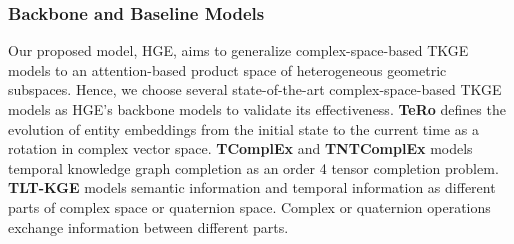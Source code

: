 \documentclass[letterpaper]{article} %
\begin{document}





\subsubsection{Backbone and Baseline Models}
Our proposed model, HGE, aims to generalize complex-space-based TKGE models to an attention-based product space of heterogeneous geometric subspaces. Hence, we choose several state-of-the-art complex-space-based TKGE models as HGE's backbone models to validate its effectiveness. \textbf{TeRo} \cite{xu2020tero} defines the evolution of entity embeddings from the initial state to the current time as a rotation in complex vector space. \textbf{TComplEx} and \textbf{TNTComplEx} \cite{tcomplexlacroix2020tensor} models temporal knowledge graph completion as an order 4 tensor completion problem. \textbf{TLT-KGE} \cite{tltcomplexzhang2022along} models semantic
information and temporal information as different parts of complex space or quaternion space. 
Complex or quaternion operations exchange information between different
parts.
\end{document}
